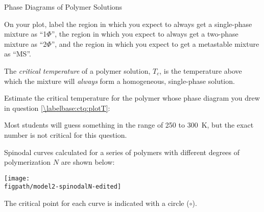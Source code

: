 \begin{activity}{Phase Diagrams of Polymer Solutions}
\begin{ctqs}
		\begin{solution}[2in]
		\end{solution}
		
	\question On your plot, label the region in which you expect to always get a single-phase mixture as ``1$\Phi$'', the region in which you expect to always get a two-phase mixture as ``2$\Phi$'', and the region in which you expect to get a metastable mixture as ``MS''.
		
		
\end{ctqs}


\begin{infobox}

	The \emph{critical temperature} of a polymer solution, $T_c$, is the temperature above which the mixture will \emph{always} form a homogeneous, single-phase solution.

\end{infobox}


\begin{ctqs}
	\question Estimate the critical temperature for the polymer whose phase diagram you drew in question \ref{\labelbase:ctq:plotT}:
	
		\begin{solution}[0.25in]
		
			Most students will guess something in the range of 250 to 300~K, but the exact number is not critical for this question.
		
		\end{solution}
		
\end{ctqs}



\begin{model}
	\label{\labelbase:mdl:Ndependence}

	Spinodal curves calculated for a series of polymers with different degrees of polymerization $N$ are shown below:
	
	\centerline{\texttt{[image: \\figpath/model2-spinodalN-edited]}}
	
	The critical point for each curve is indicated with a circle ($\circ$).
	
\end{model}

\begin{ctqs}


\end{ctqs}
\end{activity}
